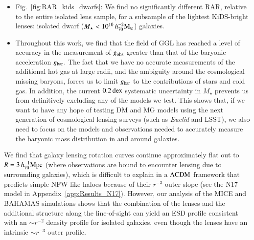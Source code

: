 \documentclass{aa}
\newcommand{\hmsun}{\,h_{70}^{-2} {\rm M_\odot}}
\newcommand{\hMpc}{\,h_{70}^{-1}{\rm{Mpc}} }
\newcommand{\dex}{\,{\rm dex}}
\newcommand{\lcdm}{{\rm \Lambda CDM}}
\newcommand{\un}[1]{_{\rm #1}}
\begin{document}
\begin{itemize}
	\item Fig.~\ref{fig:RAR_kids_dwarfs}: We find no significantly different RAR, relative to the entire isolated lens sample, for a subsample of the lightest KiDS-bright lenses: isolated dwarf ($M_\star < 10^{10} \hmsun$) galaxies.

	\item Throughout this work, we find that the field of GGL has reached a level of accuracy in the measurement of $g\un{obs}$ greater than that of the baryonic acceleration $g\un{bar}$. The fact that we have no accurate measurements of the additional hot gas at large radii, and the ambiguity around the cosmological missing baryons, forces us to limit $g\un{bar}$ to the contributions of stars and cold gas. In addition, the current $0.2 \dex$ systematic uncertainty in $M_\star$ prevents us from definitively excluding any of the models we test. This shows that, if we want to have any hope of testing DM and MG models using the next generation of cosmological lensing surveys (such as \emph{Euclid} and LSST), we also need to focus on the models and observations needed to accurately measure the baryonic mass distribution in and around galaxies.
\end{itemize}

We find that galaxy lensing rotation curves continue approximately flat out to $R=3\hMpc$ (where observations are bound to encounter lensing due to surrounding galaxies), which is difficult to explain in a $\lcdm$ framework that predicts simple NFW-like haloes because of their $r^{-3}$ outer slope (see the N17 model in Appendix~\ref{app:Results_N17}). However, our analysis of the MICE and BAHAMAS simulations shows that the combination of the lenses and the additional structure along the line-of-sight can yield an ESD profile consistent with an $\sim r^{-2}$ density profile for isolated galaxies, even though the lenses have an intrinsic $\sim r^{-3}$ outer profile.
\end{document}
